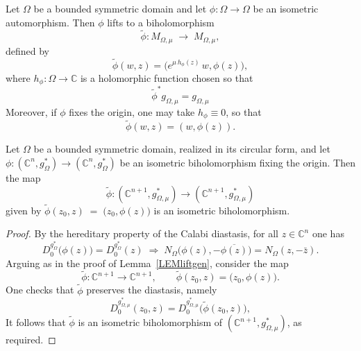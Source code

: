 \documentclass[10pt,a4paper]{amsart}
\newcommand{\C}{\mathbb{C}}
\begin{document}
\begin{lem}\label{LEMliftgen}
Let $\Omega$ be a bounded symmetric domain and let $\phi\colon \Omega\to\Omega$ be an isometric automorphism.  Then $\phi$ lifts to a biholomorphism 
\[
\tilde\phi\colon M_{\Omega, \mu}\;\longrightarrow\;M_{\Omega, \mu},
\]
defined by
\begin{equation}\label{EQliftgen}
\tilde{\phi}(w, z)
=\bigl(e^{\mu\,h_{\phi}(z)}\,w, \phi(z)\bigr),
\end{equation}
where $h_{\phi}\colon\Omega\to\C$ is a holomorphic function chosen so that
\begin{equation}\label{EQliftgen2}
\tilde\phi^*g_{{\Omega,\mu}} = g_{{\Omega,\mu}}
\end{equation}
Moreover, if $\phi$ fixes the origin, one may take $h_{\phi}\equiv0$, so that
\[
\tilde{\phi}(w, z)=(w, \phi(z)).
\]
\end{lem}

\begin{lemma}\label{LEMliftgend}
Let \(\Omega\) be a bounded symmetric domain, realized in its circular form, and let 
\(\phi\colon (\C^n,g_{\Omega}^*)\to(\C^n,g_{\Omega}^*)\)
be an isometric biholomorphism fixing the origin.  Then the  map 
\[
\tilde\phi\colon (\C^{n+1},g^*_{{\Omega,\mu}})\longrightarrow(\C^{n+1},g^*_{{\Omega,\mu}})
\]
given by $\tilde\phi(z_0, z) \;=\; \bigl(z_0, \phi(z)\bigr)$ is an isometric biholomorphism.
\end{lemma}

\begin{proof}
By the hereditary property of the Calabi diastasis, for all \(z\in\C^n\) one has
\[
D_0^{g_{\Omega}^*}\bigl(\phi(z)\bigr)
= D_0^{g_{\Omega}^*}(z)
\;\Longrightarrow\;
N_{\Omega}\bigl(\phi(z),-\overline{\phi(z)}\bigr)
= N_{\Omega}(z,-\bar z).
\]
Arguing as in the proof of Lemma~\ref{LEMliftgen}, consider the map
\[
\tilde\phi\colon \C^{n+1}\longrightarrow\C^{n+1},
\qquad
\tilde\phi(z_0,z) = \bigl(z_0,\phi(z)\bigr).
\]
One checks that \(\tilde\phi\) preserves the diastasis, namely
\[
D_0^{g^*_{{\Omega,\mu}}}(z_0,z)
= D_0^{g^*_{{\Omega,\mu}}}\bigl(\tilde\phi(z_0,z)\bigr),
\]
It follows that \(\tilde\phi\) is an isometric biholomorphism of \((\C^{n+1},g^*_{{\Omega,\mu}})\), as required.
\end{proof}
\end{document}
